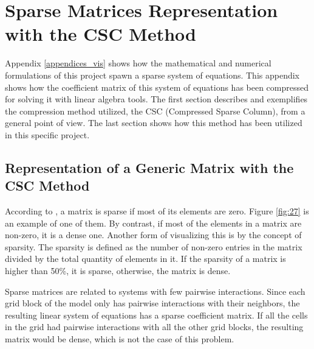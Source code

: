 \chapter{Sparse Matrices Representation with the CSC Method}
\label{appendices_smr}

Appendix \ref{appendices_vis} shows how the mathematical and numerical formulations of this project spawn a sparse system of equations. This appendix shows how the coefficient matrix of this system of equations has been compressed for solving it with linear algebra tools. The first section describes and exemplifies the compression method utilized, the CSC (Compressed Sparse Column), from a general point of view. The last section shows how this method has been utilized in this specific project.

\section{Representation of a Generic Matrix with the CSC Method}

According to \cite{Golub1996}, a matrix is sparse if most of its elements are zero. Figure \ref{fig:27} is an example of one of them. By contrast, if most of the elements in a matrix are non-zero, it is a dense one. Another form of visualizing this is by the concept of sparsity. The sparsity is defined as the number of non-zero entries in the matrix divided by the total quantity of elements in it. If the sparsity of a matrix is higher than 50\%, it is sparse, otherwise, the matrix is dense.

Sparse matrices are related to systems with few pairwise interactions. Since each grid block of the model only has pairwise interactions with their neighbors, the resulting linear system of equations has a sparse coefficient matrix. If all the cells in the grid had pairwise interactions with all the other grid blocks, the resulting matrix would be dense, which is not the case of this problem.

